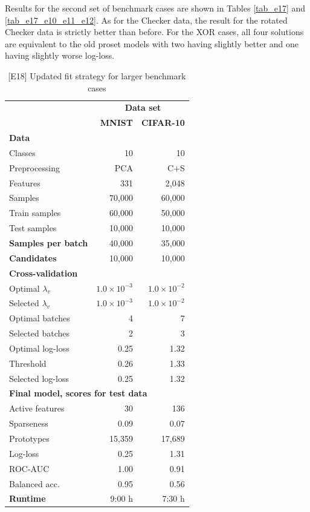 %
Results for the second set of benchmark cases are shown in Tables \ref{tab_e17} and \ref{tab_e17_e10_e11_e12}.
As for the Checker data, the result for the rotated Checker data is strictly better than before.
For the XOR cases, all four solutions are equivalent to the old proset models with two having slightly better and one having slightly worse log-loss.\par
%
\begin{table}
\caption{[E18] Updated fit strategy for larger benchmark cases}
\label{tab_e18}
%
\begin{center}
\small
\begin{tabular}{|lrr|}
\hline
&\multicolumn{2}{c|}{\textbf{\hrulefill\ Data set \hrulefill}}\\
&\textbf{MNIST}&\textbf{CIFAR-10}\\
\multicolumn{3}{|l|}{\textbf{Data}}\\
Classes&10&10\\
Preprocessing&PCA&C+S\\
Features&331&2,048\\
Samples&70,000&60,000\\
Train samples&60,000&50,000\\
Test samples&10,000&10,000\\
\textbf{Samples per batch}&40,000&35,000\\
\textbf{Candidates}&10,000&10,000\\
\multicolumn{3}{|l|}{\textbf{Cross-validation}}\\
Optimal $\lambda_v$&$1.0\times10^{-3}$&$1.0\times10^{-2}$\\
Selected $\lambda_v$&$1.0\times10^{-3}$&$1.0\times10^{-2}$\\
Optimal batches&4&7\\
Selected batches&2&3\\
Optimal log-loss&0.25&1.32\\
Threshold&0.26&1.33\\
Selected log-loss&0.25&1.32\\
\multicolumn{3}{|l|}{\textbf{Final model, scores for test data}}\\
Active features&30&136\\
Sparseness&0.09&0.07\\
Prototypes&15,359&17,689\\
Log-loss&0.25&1.31\\
ROC-AUC&1.00&0.91\\
Balanced acc.&0.95&0.56\\
\textbf{Runtime}&9:00 h&7:30 h\\
\hline
\end{tabular}
\end{center}
\end{table}
